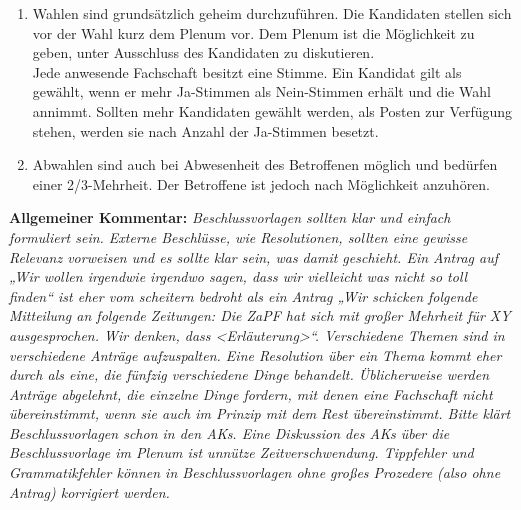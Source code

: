 \begin{enumerate}
\item{Wahlen sind grundsätzlich geheim durchzuführen. Die Kandidaten stellen sich vor der Wahl kurz
dem Plenum vor. Dem Plenum ist die Möglichkeit zu geben, unter Ausschluss des Kandidaten zu
diskutieren.\\
Jede anwesende Fachschaft besitzt eine Stimme. Ein Kandidat gilt als
gewählt, wenn er mehr Ja-Stimmen als Nein-Stimmen erhält und die
Wahl annimmt. Sollten mehr Kandidaten gewählt werden, als Posten zur
Verfügung stehen, werden sie nach Anzahl der Ja-Stimmen besetzt.}

\item{Abwahlen sind auch bei Abwesenheit des Betroffenen möglich und bedürfen einer 2/3-Mehrheit.
Der Betroffene ist jedoch nach Möglichkeit anzuhören.}
\end{enumerate}

\textbf{Allgemeiner Kommentar:}
{\footnotesize\textit{
Beschlussvorlagen sollten klar und einfach formuliert sein. Externe Beschlüsse, wie Resolutionen,
sollten eine gewisse Relevanz vorweisen und es sollte klar sein, was damit geschieht. Ein Antrag
auf „Wir wollen irgendwie irgendwo sagen, dass wir vielleicht was nicht so toll finden“ ist eher vom
scheitern bedroht als ein Antrag „Wir schicken folgende Mitteilung an folgende Zeitungen: Die
ZaPF hat sich mit großer Mehrheit für XY ausgesprochen. Wir denken, dass <Erläuterung>“.
Verschiedene Themen sind in verschiedene Anträge aufzuspalten. Eine Resolution über ein Thema
kommt eher durch als eine, die fünfzig verschiedene Dinge behandelt. Üblicherweise werden
Anträge abgelehnt, die einzelne Dinge fordern, mit denen eine Fachschaft nicht übereinstimmt,
wenn sie auch im Prinzip mit dem Rest übereinstimmt.
Bitte klärt Beschlussvorlagen schon in den AKs. Eine Diskussion des AKs über die Beschlussvorlage
im Plenum ist unnütze Zeitverschwendung.
Tippfehler und Grammatikfehler können in Beschlussvorlagen ohne großes Prozedere (also ohne
Antrag) korrigiert werden.}}\\[4ex]



